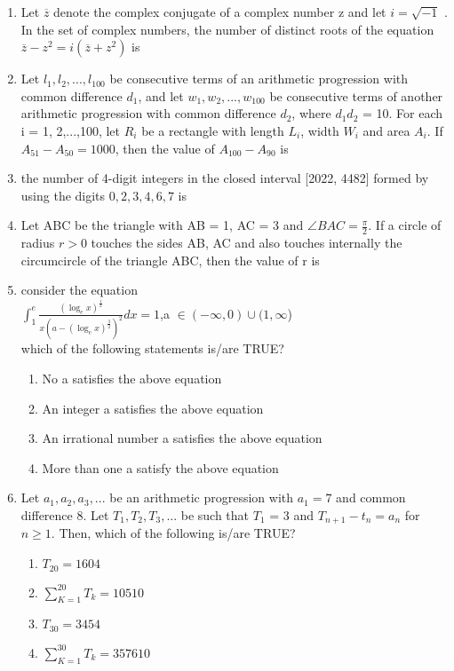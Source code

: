 \documentclass{article}
\begin{document}
\begin{enumerate}
	\item Let $\overline{z}$ denote the complex conjugate of a complex number z and let $i =\sqrt{-1}$ . In the set of complex 
numbers, the number of distinct roots of the equation\\		$\overline{z}-z^2=i(\overline{z}+z^2)$		is \underline{\hspace{2cm}}


	\item Let $l_1,l_2,...,l_{100}$ be consecutive terms of an arithmetic progression with common difference $d_1$, and let $w_1, w_2, ... , w_100$ be consecutive terms of another arithmetic progression with common difference $d_2 $, where $d_1d_2$ = 10. For each i = 1, 2,...,100, let $R_i$ be a rectangle with length $L_i$, width $W_i$ and area $A_i$. If $A_{51}-A_{50}=1000$, then the value of $A_{100}-A_{90}$ is \underline{\hspace{2cm}}
	\item the number of 4-digit integers in the closed interval [2022, 4482] formed by using the digits $0,2,3,4,6,7$ is 
	
		

	\item Let ABC be the triangle with AB = 1, AC = 3 and $\angle BAC=\frac{\pi}{2}$. If a circle of radius $r > 0$ touches the sides AB, AC and also touches internally the circumcircle of the triangle ABC, then the value of r is\underline{\hspace{2cm}}


	\item consider the equation\\
		$\int_1^e\frac{(\log_e x)^\frac{1}{2}}{x(a-(\log_e x)^\frac{3}{2})^2}dx =1$,a $\in (-\infty,0)\cup(1,\infty$) \\
which of the following statements is/are TRUE?

\begin{enumerate}[label=\Alph*.]

		\item No a satisfies the above equation
		\item An integer a satisfies the above equation
		\item An irrational number a satisfies the above equation
		\item More than one a satisfy the above equation
\end{enumerate}                                      

 
	\item Let $a_1, a_2, a_3,...$ be an arithmetic progression with $a_1 = 7$ and common difference 8. Let 
$T_1, T_2, T_3,$... be such that $T_1$ = 3 and $T_{n+1} - t_n = a_n$ for $n\ge1$. Then, which of the following is/are TRUE?\\
\begin{enumerate}[label=\Alph*.]
	\item $T_{20} =1604$  \item$\sum_{K=1}^{20}T_k=10510$
		\item $T_{30}=3454$ \item $\sum_{K=1}^{30}T_k=357610$  
\end{enumerate}



\end{enumerate}
\end{document}
